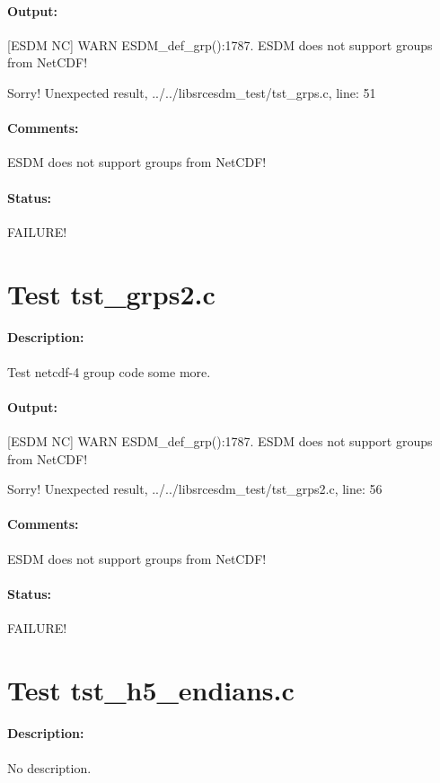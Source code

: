\paragraph{Output:} [ESDM NC] WARN ESDM\_def\_grp():1787. ESDM does not support groups from NetCDF!

Sorry! Unexpected result, ../../libsrcesdm\_test/tst\_grps.c, line: 51

\paragraph{Comments:} ESDM does not support groups from NetCDF!

\paragraph{Status:} FAILURE!

\section{Test tst\_grps2.c}

\paragraph{Description:} Test netcdf-4 group code some more.

\paragraph{Output:} [ESDM NC] WARN ESDM\_def\_grp():1787. ESDM does not support groups from NetCDF!

Sorry! Unexpected result, ../../libsrcesdm\_test/tst\_grps2.c, line: 56

\paragraph{Comments:} ESDM does not support groups from NetCDF!

\paragraph{Status:} FAILURE!

\section{Test tst\_h5\_endians.c}

\paragraph{Description:} No description.

